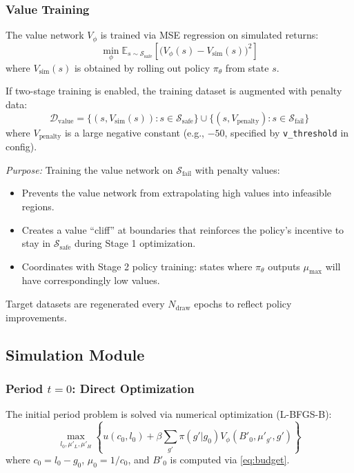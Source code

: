 \subsubsection{Value Training}
The value network $V_\phi$ is trained via MSE regression on simulated returns:
\begin{equation}
    \min_\phi \mathbb{E}_{s \sim \mathcal{S}_{\text{safe}}} \left[ \bigl(V_\phi(s) - V_{\text{sim}}(s)\bigr)^2 \right]
\end{equation}
where $V_{\text{sim}}(s)$ is obtained by rolling out policy $\pi_\theta$ from state $s$.

If two-stage training is enabled, the training dataset is augmented with penalty data:
\begin{equation}
    \mathcal{D}_{\text{value}} = \{(s, V_{\text{sim}}(s)) : s \in \mathcal{S}_{\text{safe}}\} \cup \{(s, V_{\text{penalty}}) : s \in \mathcal{S}_{\text{fail}}\}
\end{equation}
where $V_{\text{penalty}}$ is a large negative constant (e.g., $-50$, specified by \texttt{v\_threshold} in config).

\textit{Purpose:} Training the value network on $\mathcal{S}_{\text{fail}}$ with penalty values:
\begin{itemize}
    \item Prevents the value network from extrapolating high values into infeasible regions.
    \item Creates a value ``cliff'' at boundaries that reinforces the policy's incentive to stay in $\mathcal{S}_{\text{safe}}$ during Stage 1 optimization.
    \item Coordinates with Stage 2 policy training: states where $\pi_\theta$ outputs $\mu_{\max}$ will have correspondingly low values.
\end{itemize}

Target datasets are regenerated every $N_{\text{draw}}$ epochs to reflect policy improvements.


\subsection{Simulation Module}

\subsubsection{Period $t = 0$: Direct Optimization}
The initial period problem is solved via numerical optimization (L-BFGS-B):
\begin{equation}
    \max_{l_0, \mu'_L, \mu'_H} \left\{ u(c_0, l_0) + \beta \sum_{g'} \pi(g'|g_0) V_\phi(B'_0, \mu'_{g'}, g') \right\}
\end{equation}
where $c_0 = l_0 - g_0$, $\mu_0 = 1/c_0$, and $B'_0$ is computed via \eqref{eq:budget}.

